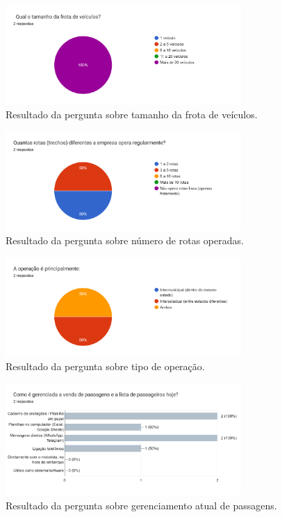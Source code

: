 \begin{apendicesenv}
  \begin{figure}[htbp]
    \centering
    \includegraphics[width=0.8\textwidth]{imagens/imagem2.png}
    \caption{Resultado da pergunta sobre tamanho da frota de veículos.}
    \label{fig:tamanho-da-frota}
  \end{figure}

  \begin{figure}[htbp]
    \centering
    \includegraphics[width=0.8\textwidth]{imagens/imagem3.png}
    \caption{Resultado da pergunta sobre número de rotas operadas.}
    \label{fig:numero-de-rotas}
  \end{figure}

  \begin{figure}[htbp]
    \centering
    \includegraphics[width=0.8\textwidth]{imagens/imagem4.png}
    \caption{Resultado da pergunta sobre tipo de operação.}
    \label{fig:tipo-de-operacao}
  \end{figure}

  \begin{figure}[htbp]
    \centering
    \includegraphics[width=0.8\textwidth]{imagens/imagem5.png}
    \caption{Resultado da pergunta sobre gerenciamento atual de passagens.}
    \label{fig:gerenciamento-atual-de-passagens}
  \end{figure}


\end{apendicesenv}
